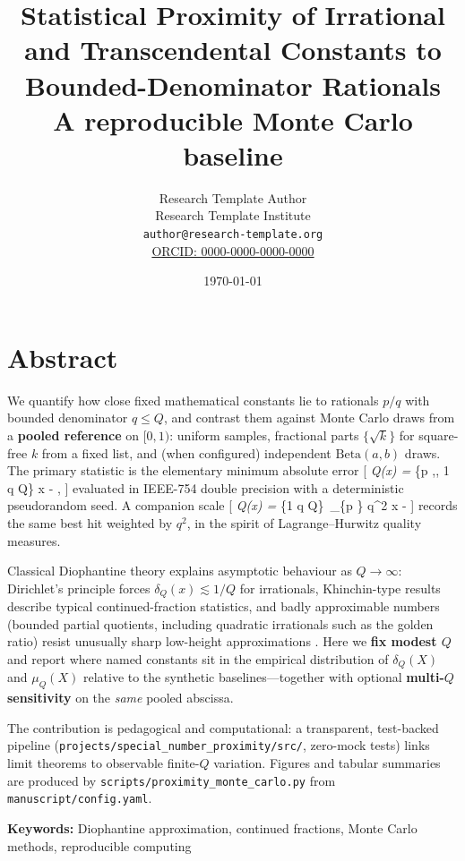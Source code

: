 \documentclass[
]{article}
\author{}
\date{}
\title{Statistical Proximity of Irrational and Transcendental Constants to Bounded-Denominator Rationals\\\normalsize A reproducible Monte Carlo baseline}
\author{Research Template Author\\\footnotesize{Research Template Institute}\\\footnotesize{\texttt{author@research-template.org}}\\\footnotesize{\href{https://orcid.org/0000-0000-0000-0000}{ORCID: 0000-0000-0000-0000}}}
\date{\today}
\begin{document}
\maketitle
\thispagestyle{empty}
\tableofcontents
\newpage


\section{Abstract}\label{abstract}

We quantify how close fixed mathematical constants lie to rationals
\(p/q\) with bounded denominator \(q \leq Q\), and contrast them against
Monte Carlo draws from a \textbf{pooled reference} on \([0,1)\): uniform
samples, fractional parts \(\{\sqrt{k}\}\) for square-free \(k\) from a
fixed list, and (when configured) independent \(\mathrm{Beta}(a,b)\)
draws. The primary statistic is the elementary minimum absolute error
{[} \delta\emph{Q(x) = \min}\{p \in {},, 1 \leq q \leq Q\}
\left\mid{} x -  \right\mid, {]} evaluated in
IEEE-754 double precision with a deterministic pseudorandom seed. A
companion scale {[} \mu\emph{Q(x) = \min}\{1 \leq q \leq Q\}~\min\_\{p
\in {}\} q\^{}2 \left\mid{} x -  \right\mid{}
{]} records the same best hit weighted by \(q^2\), in the spirit of
Lagrange--Hurwitz quality measures.

Classical Diophantine theory explains asymptotic behaviour as
\(Q \to \infty\): Dirichlet's principle forces
\(\delta_Q(x) \lesssim 1/Q\) for irrationals, Khinchin-type results
describe typical continued-fraction statistics, and badly approximable
numbers (bounded partial quotients, including quadratic irrationals such
as the golden ratio) resist unusually sharp low-height approximations
\citep{khinchin1964continued, cassels1957}. Here we \textbf{fix modest
\(Q\)} and report where named constants sit in the empirical
distribution of \(\delta_Q(X)\) and \(\mu_Q(X)\) relative to the
synthetic baselines---together with optional \textbf{multi-\(Q\)
sensitivity} on the \emph{same} pooled abscissa.

The contribution is pedagogical and computational: a transparent,
test-backed pipeline (\texttt{projects/special\_number\_proximity/src/},
zero-mock tests) links limit theorems to observable finite-\(Q\)
variation. Figures and tabular summaries are produced by
\texttt{scripts/proximity\_monte\_carlo.py} from
\texttt{manuscript/config.yaml}.

\textbf{Keywords:} Diophantine approximation, continued fractions, Monte
Carlo methods, reproducible computing
\end{document}

